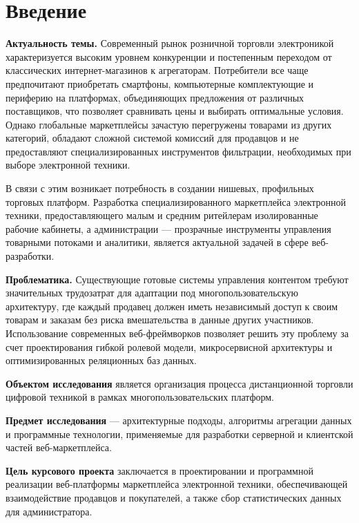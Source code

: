 \section*{Введение}

\textbf{Актуальность темы.} Современный рынок розничной торговли электроникой характеризуется высоким уровнем конкуренции и постепенным 
переходом от классических интернет-магазинов к агрегаторам. Потребители все чаще предпочитают приобретать смартфоны, компьютерные комплектующие 
и периферию на платформах, объединяющих предложения от различных поставщиков, что позволяет сравнивать цены и выбирать оптимальные условия. Однако 
глобальные маркетплейсы зачастую перегружены товарами из других категорий, обладают сложной системой комиссий для продавцов и не 
предоставляют специализированных инструментов фильтрации, необходимых при выборе электронной техники.

В связи с этим возникает потребность в создании нишевых, профильных торговых платформ. Разработка специализированного маркетплейса электронной техники, 
предоставляющего малым и средним ритейлерам изолированные рабочие кабинеты, а администрации — прозрачные инструменты управления товарными потоками и 
аналитики, является актуальной задачей в сфере веб-разработки.

\textbf{Проблематика.} Существующие готовые системы управления контентом требуют значительных трудозатрат для адаптации под многопользовательскую 
архитектуру, где каждый продавец должен иметь независимый доступ к своим товарам и заказам без риска вмешательства в данные других участников. 
Использование современных веб-фреймворков позволяет решить эту проблему за счет проектирования гибкой ролевой модели, микросервисной архитектуры и 
оптимизированных реляционных баз данных.

\textbf{Объектом исследования} является организация процесса дистанционной торговли цифровой техникой в рамках многопользовательских платформ.

\textbf{Предмет исследования} — архитектурные подходы, алгоритмы агрегации данных и программные технологии, применяемые для разработки серверной и 
клиентской частей веб-маркетплейса.

\textbf{Цель курсового проекта} заключается в проектировании и программной реализации веб-платформы маркетплейса электронной техники, обеспечивающей 
взаимодействие продавцов и покупателей, а также сбор статистических данных для администратора.



